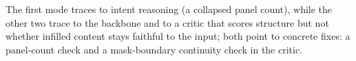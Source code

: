 \documentclass{article}
\begin{document}
\noindent The first mode traces to intent reasoning (a collapsed panel
count), while the other two trace to the backbone and to a critic that
scores structure but not whether infilled content stays faithful to the
input; both point to concrete fixes: a panel-count check and a
mask-boundary continuity check in the critic.

\newpage
% 
\end{document}
